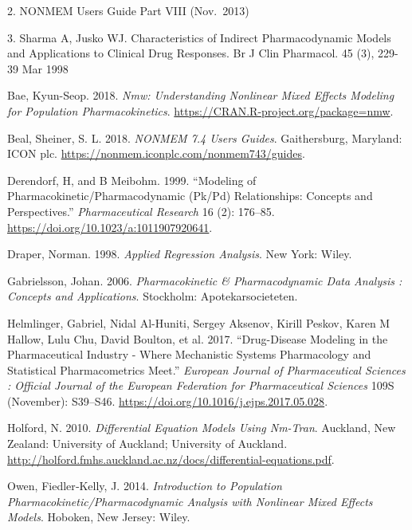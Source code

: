 \documentclass[
  10pt,
]{krantz}
\newlength{\cslhangindent}
\newenvironment{cslreferences}%
  {\setlength{\parindent}{0pt}%
  \everypar{\setlength{\hangindent}{\cslhangindent}}\ignorespaces}%
  {\par}
\begin{document}
2. NONMEM Users Guide Part VIII (Nov.~2013)

3. Sharma A, Jusko WJ. Characteristics of Indirect Pharmacodynamic
Models and Applications to Clinical Drug Responses. Br J Clin Pharmacol.
45 (3), 229-39 Mar 1998

\backmatter

\hypertarget{refs}{}
\begin{cslreferences}
\leavevmode\hypertarget{ref-R-nmw}{}%
Bae, Kyun-Seop. 2018. \emph{Nmw: Understanding Nonlinear Mixed Effects Modeling for Population Pharmacokinetics}. \url{https://CRAN.R-project.org/package=nmw}.

\leavevmode\hypertarget{ref-nonmem}{}%
Beal, Sheiner, S. L. 2018. \emph{NONMEM 7.4 Users Guides}. Gaithersburg, Maryland: ICON plc. \url{https://nonmem.iconplc.com/nonmem743/guides}.

\leavevmode\hypertarget{ref-derendorf1999modeling}{}%
Derendorf, H, and B Meibohm. 1999. ``Modeling of Pharmacokinetic/Pharmacodynamic (Pk/Pd) Relationships: Concepts and Perspectives.'' \emph{Pharmaceutical Research} 16 (2): 176--85. \url{https://doi.org/10.1023/a:1011907920641}.

\leavevmode\hypertarget{ref-draper1998applied}{}%
Draper, Norman. 1998. \emph{Applied Regression Analysis}. New York: Wiley.

\leavevmode\hypertarget{ref-gabrielsson}{}%
Gabrielsson, Johan. 2006. \emph{Pharmacokinetic \& Pharmacodynamic Data Analysis : Concepts and Applications}. Stockholm: Apotekarsocieteten.

\leavevmode\hypertarget{ref-helmlinger2017drug}{}%
Helmlinger, Gabriel, Nidal Al-Huniti, Sergey Aksenov, Kirill Peskov, Karen M Hallow, Lulu Chu, David Boulton, et al. 2017. ``Drug-Disease Modeling in the Pharmaceutical Industry - Where Mechanistic Systems Pharmacology and Statistical Pharmacometrics Meet.'' \emph{European Journal of Pharmaceutical Sciences : Official Journal of the European Federation for Pharmaceutical Sciences} 109S (November): S39--S46. \url{https://doi.org/10.1016/j.ejps.2017.05.028}.

\leavevmode\hypertarget{ref-nickholford}{}%
Holford, N. 2010. \emph{Differential Equation Models Using Nm-Tran}. Auckland, New Zealand: University of Auckland; University of Auckland. \url{http://holford.fmhs.auckland.ac.nz/docs/differential-equations.pdf}.

\leavevmode\hypertarget{ref-kelly}{}%
Owen, Fiedler‐Kelly, J. 2014. \emph{Introduction to Population Pharmacokinetic/Pharmacodynamic Analysis with Nonlinear Mixed Effects Models}. Hoboken, New Jersey: Wiley.


\end{cslreferences}
\end{document}
